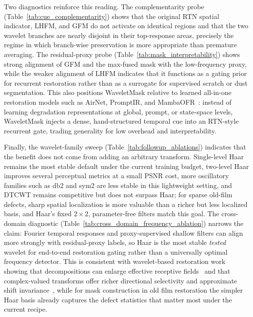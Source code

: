{Two diagnostics reinforce this reading. The complementarity probe (Table~\ref{tab:cue_complementarity}) shows that the original RTN spatial indicator, LHFM, and GFM do not activate on identical regions and that the two wavelet branches are nearly disjoint in their top-response areas, precisely the regime in which branch-wise preservation is more appropriate than premature averaging. The residual-proxy probe (Table~\ref{tab:mask_interpretability}) shows strong alignment of GFM and the max-fused mask with the low-frequency proxy, while the weaker alignment of LHFM indicates that it functions as a gating prior for recurrent restoration rather than as a surrogate for supervised scratch or dust segmentation. This also positions WaveletMask relative to learned all-in-one restoration models such as AirNet, PromptIR, and MambaOFR~\cite{li2022airnet,potlapalli2023promptir,mao2025mambaofr}: instead of learning degradation representations at global, prompt, or state-space levels, WaveletMask injects a dense, hand-structured temporal cue into an RTN-style recurrent gate, trading generality for low overhead and interpretability.

Finally, the wavelet-family sweep (Table~\ref{tab:followup_ablations}) indicates that the benefit does not come from adding an arbitrary transform. Single-level Haar remains the most stable default under the current training budget, two-level Haar improves several perceptual metrics at a small PSNR cost, more oscillatory families such as db2 and sym2 are less stable in this lightweight setting, and DTCWT remains competitive but does not surpass Haar; for sparse old-film defects, sharp spatial localization is more valuable than a richer but less localized basis, and Haar's fixed $2\times2$, parameter-free filters match this goal. The cross-domain diagnostic (Table~\ref{tab:cross_domain_frequency_ablation}) narrows the claim: Fourier temporal responses and proxy-supervised shallow filters can align more strongly with residual-proxy labels, so Haar is the most stable \emph{tested} wavelet for end-to-end restoration gating rather than a universally optimal frequency detector. This is consistent with wavelet-based restoration work showing that decompositions can enlarge effective receptive fields~\cite{liu2018mwcnn} and that complex-valued transforms offer richer directional selectivity and approximate shift invariance~\cite{selesnick2005dual}, while for mask construction in old film restoration the simpler Haar basis already captures the defect statistics that matter most under the current recipe.

}

